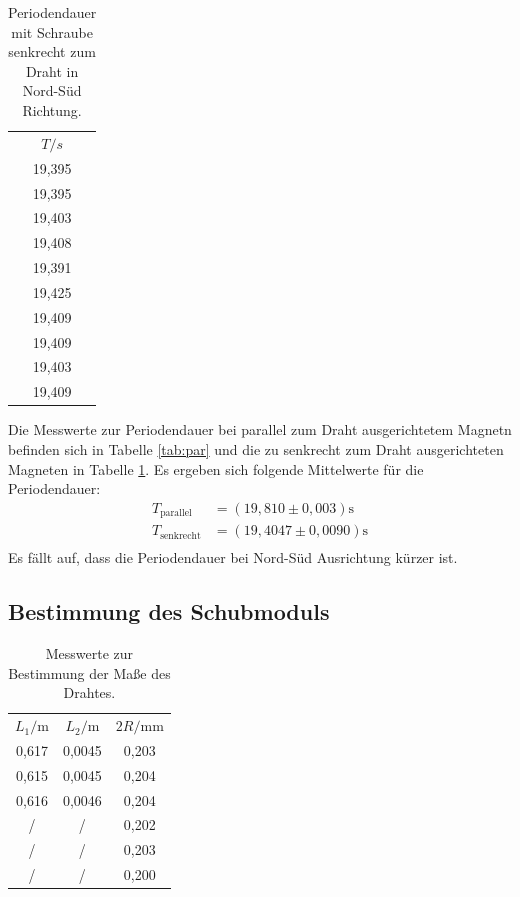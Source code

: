     \begin{table}
      \caption{Periodendauer mit Schraube senkrecht zum Draht in Nord-Süd Richtung.}
      \centering
      \label{tab:senk}
      \begin{tabular}{c}
        \toprule
        $T/s$ \\
        19,395 \\
        19,395 \\
        19,403 \\
        19,408 \\
        19,391 \\
        19,425 \\
        19,409 \\
        19,409 \\
        19,403 \\
        19,409 \\
        \bottomrule
        \end{tabular}
        \end{table}

Die Messwerte zur Periodendauer bei parallel zum Draht ausgerichtetem Magnetn befinden sich in Tabelle \ref{tab:par} und die zu senkrecht zum Draht ausgerichteten Magneten in Tabelle \ref{tab:senk}.
Es ergeben sich folgende Mittelwerte für die Periodendauer:
\begin{align}
  T_\mathrm{parallel}&=(19,810 \pm 0,003) \si{\second} \\
  T_\mathrm{senkrecht}&=(19,4047 \pm 0,0090) \si{\second} \\
\end{align}
Es fällt auf, dass die Periodendauer bei Nord-Süd Ausrichtung kürzer ist.


\subsection{Bestimmung des Schubmoduls}

\begin{table}
  \caption{Messwerte zur Bestimmung der Maße des Drahtes.}
  \centering
  \label{tab:draht}
  \begin{tabular}{c c c}
    \toprule
    $L_1 / \si{\meter}$ & $L_2 / \si{\meter}$ & $2R / \si{\milli \meter}$ \\
0,617 & 0,0045 & 0,203 \\
0,615 & 0,0045 & 0,204 \\
0,616 & 0,0046 & 0,204 \\
/ & / & 0,202 \\
/ & / & 0,203 \\
/ & / & 0,200 \\
\bottomrule
\end{tabular}
\end{table}

